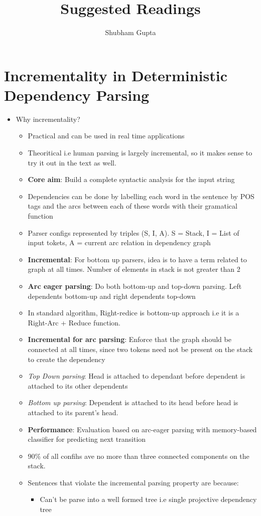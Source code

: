 \documentclass[a4paper]{article}
\title{Suggested Readings}
\author{Shubham Gupta}
\begin{document}
\maketitle
\section{Incrementality in Deterministic Dependency Parsing}
\begin{itemize}
    \item Why incrementality?
        \begin{itemize}
            \item Practical and can be used in real time applications
            \item Theoritical i.e human parsing is largely incremental, so it makes sense to try it out in the text as well.
            \item \textbf{Core aim}: Build a complete syntactic analysis for the input string
            \item Dependencies can be done by labelling each word in the sentence by POS tags and the arcs between each of these words with their gramatical function
            \item Parser configs represented by triples (S, I, A). S = Stack, I = List of input tokets, A = current arc relation in dependency graph
            \item \textbf{Incremental}: For bottom up parsers, idea is to have a term related to graph at all times. Number of elements in stack is not greater than 2 
            \item \textbf{Arc eager parsing}: Do both bottom-up and top-down parsing. Left dependents bottom-up and right dependents top-down 
            \item In standard algorithm, Right-redice is bottom-up approach i.e it is a Right-Arc + Reduce function.
            \item \textbf{Incremental for arc parsing}: Enforce that the graph should be connected at all times, since two tokens need not be present on the stack to create the dependency  
            \item \textit{Top Down parsing}: Head is attached to dependant before dependent is attached to its other dependents 
            \item \textit{Bottom up parsing}: Dependent is attached to its head before head is attached to its parent's head.
            \item \textbf{Performance}: Evaluation based on arc-eager parsing with memory-based classifier for predicting next transition
            \item 90\% of all confihs ave no more than three connected components on the stack.
            \item Sentences that violate the incremental parsing property are because:
                \begin{itemize}
                    \item Can't be parse into a well formed tree i.e single projective dependency tree
                \end{itemize}
        \end{itemize}
\end{itemize}
\end{document}
